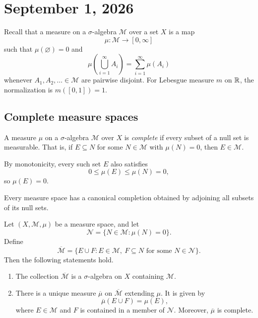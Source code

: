 \section{September 1, 2026}

Recall that a measure on a $\sigma$-algebra $\mathcal M$ over a set $X$
is a map
\[
  \mu\colon\mathcal M\longrightarrow[0,\infty]
\]
such that $\mu(\varnothing)=0$ and
\[
  \mu\left(\bigcup_{i=1}^{\infty}A_i\right)
  =\sum_{i=1}^{\infty}\mu(A_i)
\]
whenever $A_1,A_2,\ldots\in\mathcal M$ are pairwise disjoint. For
Lebesgue measure $m$ on $\mathbb{R}$, the normalization is $m([0,1])=1$.

\subsection{Complete measure spaces}

\begin{definition}
  A measure $\mu$ on a $\sigma$-algebra $\mathcal M$ over $X$ is
  \emph{complete} if every subset of a null set is measurable. That is,
  if $E\subseteq N$ for some $N\in\mathcal M$ with $\mu(N)=0$, then
  $E\in\mathcal M$.
\end{definition}

By monotonicity, every such set $E$ also satisfies
\[
  0\leq\mu(E)\leq\mu(N)=0,
\]
so $\mu(E)=0$.

Every measure space has a canonical completion obtained by adjoining all
subsets of its null sets.

\begin{proposition}
  Let $(X,\mathcal M,\mu)$ be a measure space, and let
  \[
    \mathcal N=\{N\in\mathcal M:\mu(N)=0\}.
  \]
  Define
  \[
    \overline{\mathcal M}
    =\{E\cup F:E\in\mathcal M,\ F\subseteq N
      \text{ for some }N\in\mathcal N\}.
  \]
  Then the following statements hold.
  \begin{enumerate}[label=(\roman*)]
    \item The collection $\overline{\mathcal M}$ is a $\sigma$-algebra
      on $X$ containing $\mathcal M$.
    \item There is a unique measure $\overline\mu$ on
      $\overline{\mathcal M}$ extending $\mu$. It is given by
      \[
        \overline\mu(E\cup F)=\mu(E),
      \]
      where $E\in\mathcal M$ and $F$ is contained in a member of
      $\mathcal N$. Moreover, $\overline\mu$ is complete.
  \end{enumerate}
\end{proposition}


